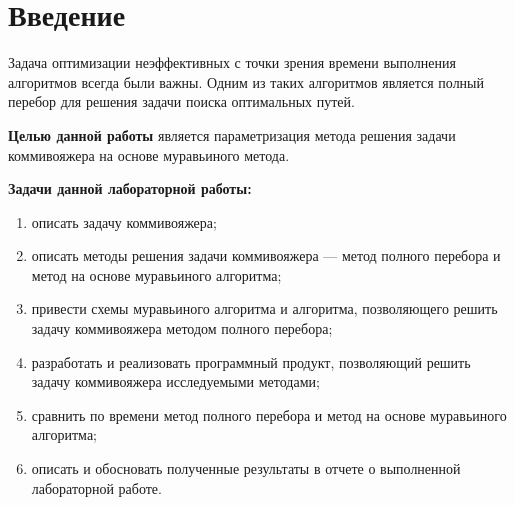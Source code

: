 \chapter*{Введение}
Задача оптимизации неэффективных с точки зрения времени выполнения алгоритмов всегда были важны.
Одним из таких алгоритмов является полный перебор для решения задачи поиска оптимальных путей.


\textbf{Целью данной работы} является параметризация метода решения задачи коммивояжера на основе муравьиного метода.

\textbf{Задачи данной лабораторной работы:}
\begin{enumerate}
	\item описать задачу коммивояжера;
	\item описать методы решения задачи коммивояжера --- метод полного перебора и метод на основе муравьиного алгоритма;
	\item привести схемы муравьиного алгоритма и алгоритма, позволяющего решить задачу коммивояжера методом полного перебора;
	\item разработать и реализовать программный продукт, позволяющий решить задачу коммивояжера исследуемыми методами;
	\item сравнить по времени метод полного перебора и метод на основе муравьиного алгоритма;
	\item описать и обосновать полученные результаты в отчете о выполненной лабораторной работе.
\end{enumerate}
